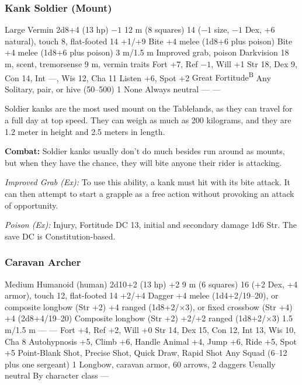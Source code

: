 \subsubsection{Kank Soldier (Mount)}
\begin{MonsterStats}
{Large Vermin}
{2d8+4 (13 hp)}
{$-1$}
{12 m (8 squares)}
{14 ($-1$ size, $-1$ Dex, +6 natural), touch 8, flat-footed 14}
{+1/+9}
{Bite +4 melee (1d8+6 plus poison)}
{Bite +4 melee (1d8+6 plus poison)}
{3 m/1.5 m}
{Improved grab, poison}
{Darkvision 18 m, scent, tremorsense 9 m, vermin traits}
{Fort +7, Ref $-1$, Will +1}
{Str 18, Dex 9, Con 14, Int ---, Wis 12, Cha 11}
{
	Listen +6,
	Spot +2
}
{
	Great Fortitude\textsuperscript{B}
}
{Any}
{Solitary, pair, or hive (50--500)}
{1}
{None}
{Always neutral}
{---}
{---}
\end{MonsterStats}

Soldier kanks are the most used mount on the Tablelands, as they can travel for a full day at top speed. They can weigh as much as 200 kilograms, and they are 1.2 meter in height and 2.5 meters in length.

\textbf{Combat:} Soldier kanks usually don't do much besides run around as mounts, but when they have the chance, they will bite anyone their rider is attacking.

\textit{Improved Grab (Ex):} To use this ability, a kank must hit with its bite attack. It can then attempt to start a grapple as a free action without provoking an attack of opportunity.

\textit{Poison (Ex):} Injury, Fortitude DC 13, initial and secondary damage 1d6 Str. The save DC is Constitution-based.


\subsubsection{Caravan Archer}
\begin{MonsterStats}
{Medium Humanoid (human)}
{2d10+2 (13 hp)}
{+2}
{9 m (6 squares)}
{16 (+2 Dex, +4 armor), touch 12, flat-footed 14}
{+2/+4}
{Dagger +4 melee (1d4+2/19--20), or composite longbow (Str +2) +4 ranged (1d8+2/$\times$3), or fixed crossbow (Str +4) +4 (2d8+4/19--20)}
{Composite longbow (Str +2) +2/+2 ranged (1d8+2/$\times$3)}
{1.5 m/1.5 m}
{---}
{---}
{Fort +4, Ref +2, Will +0}
{Str 14, Dex 15, Con 12, Int 13, Wis 10, Cha 8}
{
	Autohypnosis +5,
	Climb +6,
	Handle Animal +4,
	Jump +6,
	Ride +5,
	Spot +5
}
{
	Point-Blank Shot,
	Precise Shot,
	Quick Draw,
	Rapid Shot
}
{Any}
{Squad (6--12 plus one sergeant)}
{1}
{Longbow, caravan armor, 60 arrows, 2 daggers}
{Usually neutral}
{By character class}
{---}
\end{MonsterStats}

